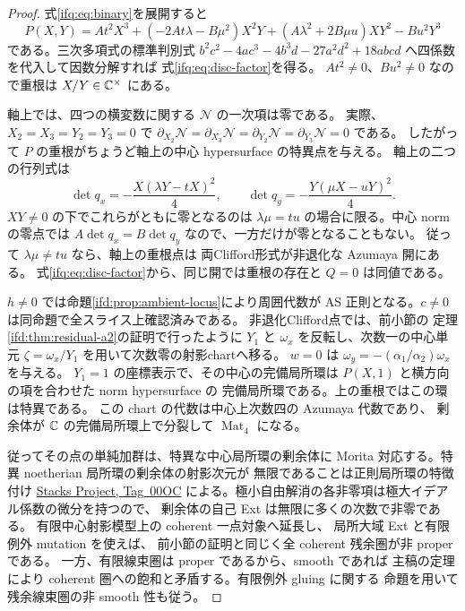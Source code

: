 \begin{proof}
式\eqref{ifq:eq:binary}を展開すると
\[
 P(X,Y)
 =At^2X^3+(-2At\lambda-B\mu^2)X^2Y
 +(A\lambda^2+2B\mu u)XY^2-Bu^2Y^3
\]
である。三次多項式の標準判別式
$b^2c^2-4ac^3-4b^3d-27a^2d^2+18abcd$
へ四係数を代入して因数分解すれば
式\eqref{ifq:eq:disc-factor}を得る。
$At^2\ne0$、$Bu^2\ne0$ なので重根は $X/Y\in\mathbb C^\times$ にある。

軸上では、四つの横変数に関する $\mathcal N$ の一次項は零である。
実際、$X_2=X_3=Y_2=Y_3=0$ で
$\partial_{X_2}\mathcal N=\partial_{X_3}\mathcal N
=\partial_{Y_2}\mathcal N=\partial_{Y_3}\mathcal N=0$ である。
したがって $P$ の重根がちょうど軸上の中心 hypersurface の特異点を与える。
軸上の二つの行列式は
\[
 \det q_x=-\frac{X(\lambda Y-tX)^2}{4},\qquad
 \det q_y=-\frac{Y(\mu X-uY)^2}{4}.
\]
$XY\ne0$ の下でこれらがともに零となるのは
$\lambda\mu=tu$ の場合に限る。中心 norm の零点では
$A\det q_x=B\det q_y$ なので、一方だけが零となることもない。
従って $\lambda\mu\ne tu$ なら、軸上の重根点は
両Clifford形式が非退化な Azumaya 開にある。
式\eqref{ifq:eq:disc-factor}から、同じ開では重根の存在と $Q=0$ は同値である。

$h\ne0$ では命題\ref{ifd:prop:ambient-locus}により周囲代数が
AS 正則となる。$c\ne0$ は同命題で全スライス上確認済みである。
非退化Clifford点では、前小節の
定理\ref{ifd:thm:residual-a2}の証明で行ったように
$Y_1$ と $\omega_x$ を反転し、次数一の中心単元
$\zeta=\omega_x/Y_1$ を用いて次数零の射影chartへ移る。
$w=0$ は $\omega_y=-(\alpha_1/\alpha_2)\omega_x$ を与える。
$Y_1=1$ の座標表示で、その中心の完備局所環は
$P(X,1)$ と横方向の項を合わせた norm hypersurface の
完備局所環である。上の重根ではこの環は特異である。
この chart の代数は中心上次数四の Azumaya 代数であり、
剰余体が $\mathbb C$ の完備局所環上で分裂して
$\operatorname{Mat}_4$ になる。

従ってその点の単純加群は、特異な中心局所環の剰余体に
Morita 対応する。特異 noetherian 局所環の剰余体の射影次元が
無限であることは正則局所環の特徴付け
\href{https://stacks.math.columbia.edu/tag/00OC}{Stacks Project, Tag~00OC}
による。極小自由解消の各非零項は極大イデアル係数の微分を持つので、
剰余体の自己 Ext は無限に多くの次数で非零である。
有限中心射影模型上の coherent 一点対象へ延長し、
局所大域 Ext と有限例外 mutation を使えば、
前小節の証明と同じく全 coherent 残余圏が非 proper である。
一方、有限線束圏は proper であるから、smooth であれば
主稿の定理により
coherent 圏への飽和と矛盾する。有限例外 gluing に関する
命題を用いて
残余線束圏の非 smooth 性も従う。
\end{proof}

